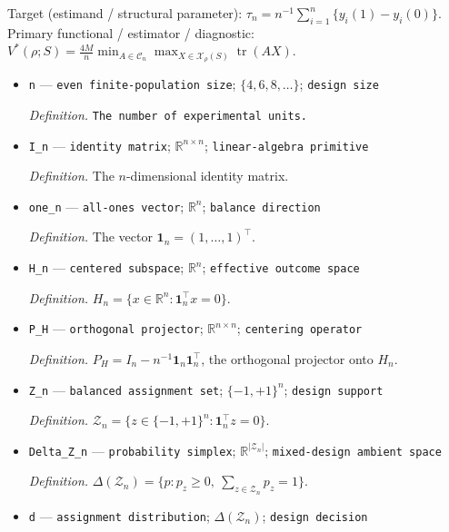 \documentclass{article}
\begin{document}
Target (estimand / structural parameter): \(\tau_n=n^{-1}\sum_{i=1}^n\{y_i(1)-y_i(0)\}\).
Primary functional / estimator / diagnostic: \(V^*(\rho;S)=\frac{4M}{n}\min_{A\in\mathcal C_n}\max_{X\in\mathcal X_\rho(S)}\operatorname{tr}(AX)\).
\begin{itemize}
  \item \texttt{n} --- \texttt{even finite-\allowbreak{}population size}; \(\{4,6,8,\ldots\}\); \texttt{design size}
  \par\smallskip\noindent\emph{Definition.} \texttt{The number of experimental units.}
  \item \texttt{I\_\allowbreak{}n} --- \texttt{identity matrix}; \(\mathbb R^{n\times n}\); \texttt{linear-\allowbreak{}algebra primitive}
  \par\smallskip\noindent\emph{Definition.} The \(n\)-dimensional identity matrix.
  \item \texttt{one\_\allowbreak{}n} --- \texttt{all-\allowbreak{}ones vector}; \(\mathbb R^n\); \texttt{balance direction}
  \par\smallskip\noindent\emph{Definition.} The vector \(\mathbf 1_n=(1,\ldots,1)^\top\).
  \item \texttt{H\_\allowbreak{}n} --- \texttt{centered subspace}; \(\mathbb R^n\); \texttt{effective outcome space}
  \par\smallskip\noindent\emph{Definition.} \(H_n=\{x\in\mathbb R^n:\mathbf 1_n^\top x=0\}\).
  \item \texttt{P\_\allowbreak{}H} --- \texttt{orthogonal projector}; \(\mathbb R^{n\times n}\); \texttt{centering operator}
  \par\smallskip\noindent\emph{Definition.} \(P_H=I_n-n^{-1}\mathbf 1_n\mathbf 1_n^\top\), the orthogonal projector onto \(H_n\).
  \item \texttt{Z\_\allowbreak{}n} --- \texttt{balanced assignment set}; \(\{-1,+1\}^n\); \texttt{design support}
  \par\smallskip\noindent\emph{Definition.} \(\mathcal Z_n=\{z\in\{-1,+1\}^n:\mathbf 1_n^\top z=0\}\).
  \item \texttt{Delta\_\allowbreak{}Z\_\allowbreak{}n} --- \texttt{probability simplex}; \(\mathbb R^{|\mathcal Z_n|}\); \texttt{mixed-\allowbreak{}design ambient space}
  \par\smallskip\noindent\emph{Definition.} \(\Delta(\mathcal Z_n)=\{p:p_z\geq0,\ \sum_{z\in\mathcal Z_n}p_z=1\}\).
  \item \texttt{d} --- \texttt{assignment distribution}; \(\Delta(\mathcal Z_n)\); \texttt{design decision}

\end{itemize}
\end{document}

